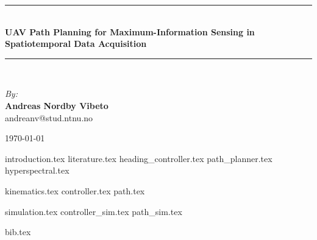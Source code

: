 \documentclass{article}
\newcommand{\HRule}{\rule{\linewidth}{0.5mm}}
\numberwithin{equation}{section}
\begin{document}
\begin{center}
\HRule \\[0.4cm]
{ \huge \bfseries UAV Path Planning for Maximum-Information Sensing in Spatiotemporal Data Acquisition}
\HRule \\[1.5cm]

\begin{center} \large
\emph{By:}\\
\textbf{Andreas Nordby Vibeto}\\
andreanv@stud.ntnu.no
\end{center}

\vfill

{\large \monthyear\today}

\end{center}
\newpage

\tableofcontents

\newpage


{introduction.tex}
\newpage
{literature.tex}
{heading_controller.tex}
{path_planner.tex}
{hyperspectral.tex}

{kinematics.tex}
{controller.tex}
{path.tex}

{simulation.tex}
{controller_sim.tex}
{path_sim.tex}


\newpage
{bib.tex}
\end{document}
